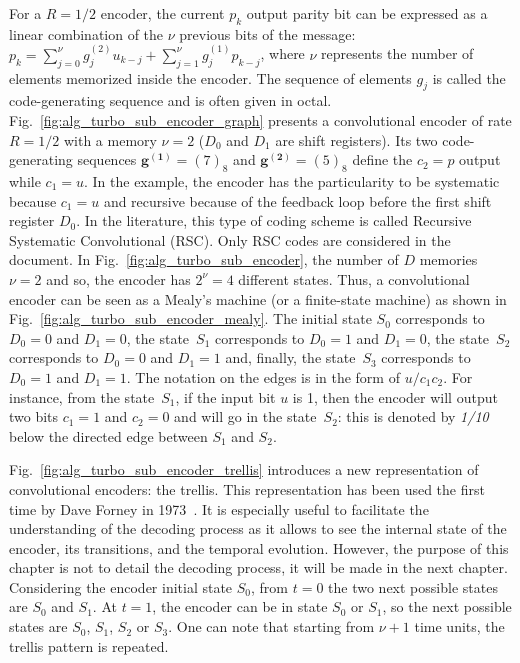 For a $R=1/2$ encoder, the current $p_k$ output parity bit can be expressed as a
linear combination of the $\nu$ previous bits of the message:
$p_k = \sum_{j=0}^\nu g^{(2)}_{j} u_{k-j} + \sum_{j=1}^\nu g^{(1)}_{j} p_{k-j}$,
where $\nu$ represents the number of elements memorized inside the encoder.
The sequence of elements $g_j$ is called the code-generating sequence and is
often given in octal. Fig.~\ref{fig:alg_turbo_sub_encoder_graph} presents a
convolutional encoder of rate $R = 1/2$ with a memory $\nu = 2$ ($D_0$ and $D_1$
are shift registers). Its two code-generating sequences $\bm{g^{(1)}} = (7)_8$
and $\bm{g^{(2)}} = (5)_8$ define the $c_2 = p$ output while $c_1 = u$. In
the example, the encoder has the particularity to be systematic because
$c_1 = u$ and recursive because of the feedback loop before the first shift
register $D_0$. In the literature, this type of coding scheme is called
Recursive Systematic Convolutional (RSC). Only RSC codes are considered in the
document. In Fig.~\ref{fig:alg_turbo_sub_encoder}, the number of $D$ memories
$\nu = 2$ and so, the encoder has $2^\nu = 4$ different states. Thus, a
convolutional encoder can be seen as a Mealy's machine (or a finite-state
machine) as shown in Fig.~\ref{fig:alg_turbo_sub_encoder_mealy}. The initial
state $S_0$ corresponds to $D_0 = 0$ and $D_1 = 0$, the state~$S_1$ corresponds
to $D_0 = 1$ and $D_1 = 0$, the state~$S_2$ corresponds to $D_0 = 0$ and
$D_1 = 1$ and, finally, the state~$S_3$ corresponds to $D_0 = 1$ and $D_1 = 1$.
The notation on the edges is in the form of $u/c_1c_2$. For instance, from the
state~$S_1$, if the input bit $u$ is 1, then the encoder will output two bits
$c_1 = 1$ and $c_2 = 0$ and will go in the state~$S_2$: this is denoted by
\emph{1/10} below the directed edge between $S_1$ and $S_2$.

Fig.~\ref{fig:alg_turbo_sub_encoder_trellis} introduces a new representation of
convolutional encoders: the trellis. This representation has been used the first
time by Dave Forney in 1973~\cite{Forney1973}. It is especially useful to
facilitate the understanding of the decoding process as it allows to see the
internal state of the encoder, its transitions, and the temporal evolution.
However, the purpose of this chapter is not to detail the decoding process, it
will be made in the next chapter. Considering the encoder initial state $S_0$,
from $t = 0$ the two next possible states are $S_0$ and $S_1$. At $t = 1$, the
encoder can be in state $S_0$ or $S_1$, so the next possible states are $S_0$,
$S_1$, $S_2$ or $S_3$. One can note that starting from $\nu +1$ time units, the
trellis pattern is repeated.

